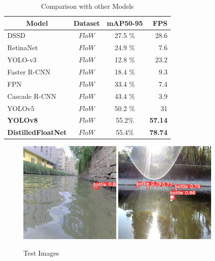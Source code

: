 \begin{table}[H]
    \centering
 
\begin{tabular}{lccr}
\hline \multicolumn{1}{c}{Model} & Dataset & mAP50-95 & FPS\\
\hline DSSD & $FloW $ & 27.5 \% & 28.6\\
RetinaNet & $FloW $  & 24.9 \% & 7.6\\
YOLO-v3 & $FloW $ & 12.8 \% & 23.2\\
Faster R-CNN & $FloW $ & 18.4 \%  & 9.3\\
FPN & $FloW $ & 33.4 \% & 7.4\\
Cascade R-CNN & $FloW $ & 43.4 \% & 3.9\\
YOLOv5 & $FloW $ & 50.2 \% & 31\\
\textbf{YOLOv8} & \textbf{$FloW$}  & 55.2\% & \textbf{57.14}\\
\textbf{DistilledFloatNet} & \textbf{$FloW$} & 55.4\% & \textbf{78.74}\\
\hline
\end{tabular}
\caption{Comparison with other Models}
   \label{table:training-3}
\end{table}

\vspace{\baselineskip}
\vspace{\baselineskip}
\begin{figure}[H]
\centering
\subcaptionbox{}
{\includegraphics[width=0.45\textwidth]{images/test-img-1.png}}%
\hfill %
\subcaptionbox{}
{\includegraphics[width=0.45\textwidth]{images/test-image-2.png}}%
\caption{Test Images}
\label{fig:test}
\end{figure}

